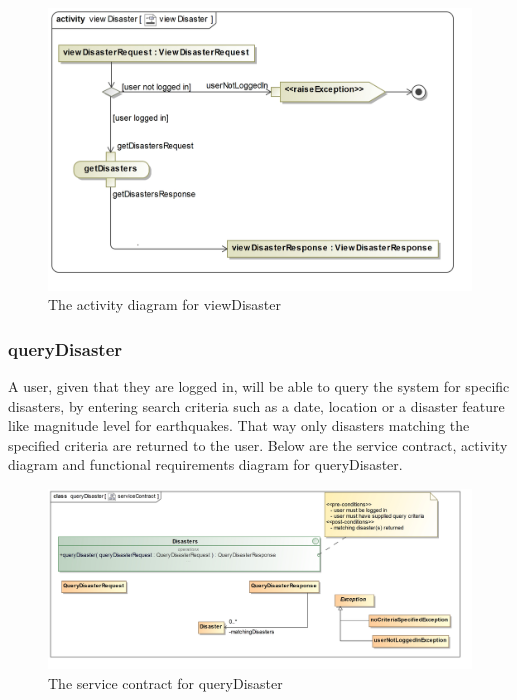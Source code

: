 \begin{figure}[H]
	\centering
	\includegraphics[width=1.2\textwidth]{../images/funcReq/viewDisasterActivityDiagram.jpg}
	\caption{The activity diagram for viewDisaster \label{overflow}}
\end{figure}

\subsubsection{queryDisaster}

A user, given that they are logged in, will be able to query the system for specific disasters, by entering search criteria such as a date, location or a disaster feature like magnitude level for earthquakes. That way only disasters matching the specified criteria are returned to the user. Below are the service contract, activity diagram and functional requirements diagram for queryDisaster.

 \begin{figure}[H]
	\centering
	\includegraphics[scale=0.19]{../images/funcReq/queryDisasterServiceContract.jpg}
	\caption{The service contract for queryDisaster \label{overflow}}
\end{figure}

